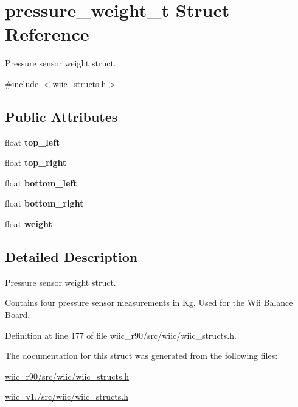 \hypertarget{structpressure__weight__t}{\section{pressure\-\_\-weight\-\_\-t Struct Reference}
\label{structpressure__weight__t}
}


Pressure sensor weight struct.  




{\ttfamily \#include $<$wiic\-\_\-structs.\-h$>$}

\subsection*{Public Attributes}
\begin{DoxyCompactItemize}
\item 
\hypertarget{structpressure__weight__t_a4603611d0fdb9b80e4465f798f78a24d}{float {\bfseries top\-\_\-left}}\label{structpressure__weight__t_a4603611d0fdb9b80e4465f798f78a24d}

\item 
\hypertarget{structpressure__weight__t_a9821f4d6ef40b6a796d9dd58f95cc987}{float {\bfseries top\-\_\-right}}\label{structpressure__weight__t_a9821f4d6ef40b6a796d9dd58f95cc987}

\item 
\hypertarget{structpressure__weight__t_aadd0292e24dfbfed6d62050447d7496d}{float {\bfseries bottom\-\_\-left}}\label{structpressure__weight__t_aadd0292e24dfbfed6d62050447d7496d}

\item 
\hypertarget{structpressure__weight__t_a50f211934ff8139f85ba41c71834be9a}{float {\bfseries bottom\-\_\-right}}\label{structpressure__weight__t_a50f211934ff8139f85ba41c71834be9a}

\item 
\hypertarget{structpressure__weight__t_ab35b28c2c97cff296b9e94d327dd2097}{float {\bfseries weight}}\label{structpressure__weight__t_ab35b28c2c97cff296b9e94d327dd2097}

\end{DoxyCompactItemize}


\subsection{Detailed Description}
Pressure sensor weight struct. 

Contains four pressure sensor measurements in Kg. Used for the Wii Balance Board. 

Definition at line 177 of file wiic\-\_\-r90/src/wiic/wiic\-\_\-structs.\-h.



The documentation for this struct was generated from the following files\-:\begin{DoxyCompactItemize}
\item 
\hyperlink{wiic__r90_2src_2wiic_2wiic__structs_8h}{wiic\-\_\-r90/src/wiic/wiic\-\_\-structs.\-h}\item 
\hyperlink{wiic__v1_81_2src_2wiic_2wiic__structs_8h}{wiic\-\_\-v1./src/wiic/wiic\-\_\-structs.\-h}\end{DoxyCompactItemize}
